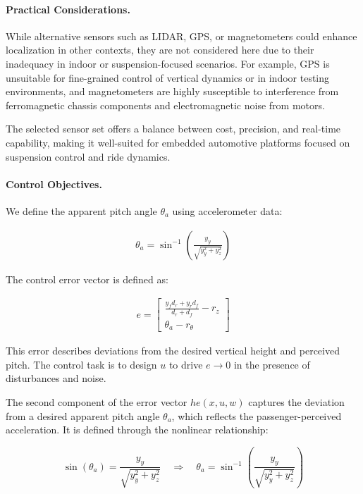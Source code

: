 \documentclass[]{report}
\begin{document}
	\paragraph{Practical Considerations.}
	While alternative sensors such as LIDAR, GPS, or magnetometers could enhance localization in other contexts, they are not considered here due to their inadequacy in indoor or suspension-focused scenarios. For example, GPS is unsuitable for fine-grained control of vertical dynamics or in indoor testing environments, and magnetometers are highly susceptible to interference from ferromagnetic chassis components and electromagnetic noise from motors.
	
	The selected sensor set offers a balance between cost, precision, and real-time capability, making it well-suited for embedded automotive platforms focused on suspension control and ride dynamics.
	
	
	\paragraph{Control Objectives.}
	
	We define the apparent pitch angle $\theta_a$ using accelerometer data:
	
	\begin{align}
		\theta_a = \sin^{-1} \left( \frac{y_y}{\sqrt{y_y^2 + y_z^2}} \right)
	\end{align}
	
	The control error vector is defined as:
	
	\begin{align}
		e = \begin{bmatrix}
			\frac{y_f d_r + y_r d_f}{d_r + d_f} - r_z \\
			\theta_a - r_\theta
		\end{bmatrix}
	\end{align}
	
	This error describes deviations from the desired vertical height and perceived pitch. The control task is to design $u$ to drive $e \rightarrow 0$ in the presence of disturbances and noise.
	
	The second component of the error vector $he(x,u,w)$ captures the deviation from a desired apparent pitch angle $\theta_a$, which reflects the passenger-perceived acceleration. It is defined through the nonlinear relationship:
	
\begin{equation}
		\sin(\theta_a) = \frac{y_y}{\sqrt{y_y^2 + y_z^2}} \quad \Rightarrow \quad \theta_a = \sin^{-1}\left(\frac{y_y}{\sqrt{y_y^2 + y_z^2}}\right)
\end{equation}
	
\end{document}
